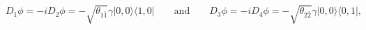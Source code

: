 \begin{equation}
 D_1\phi=-iD_2\phi=-\sqrt{\theta_{1\bar{1}}}\gamma
                   |0,0\rangle\langle 1,0|
 \qquad\text{and}\qquad
  D_3\phi=-iD_4\phi=-\sqrt{\theta_{2\bar{2}}}\gamma
                   |0,0\rangle\langle 0,1|,
\end{equation}

